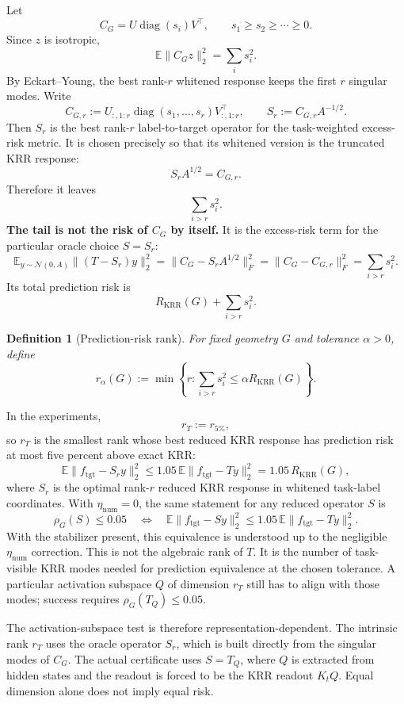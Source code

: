 \documentclass[11pt]{article}
\newtheorem{definition}{Definition}
\begin{document}
Let
\[
C_G=U\operatorname{diag}(s_i)V^\top,
\qquad
s_1\ge s_2\ge\cdots\ge0.
\]
Since \(z\) is isotropic,
\[
\mathbb{E}\|C_Gz\|_2^2=\sum_i s_i^2.
\]
By Eckart--Young, the best rank-\(r\) whitened response keeps the first \(r\) singular modes. Write
\[
C_{G,r}:=U_{:,1:r}\operatorname{diag}(s_1,\ldots,s_r)V_{:,1:r}^\top,
\qquad
S_r:=C_{G,r}A^{-1/2}.
\]
Then \(S_r\) is the best rank-\(r\) label-to-target operator for the task-weighted excess-risk
metric. It is chosen precisely so that its whitened version is the truncated KRR response:
\[
S_rA^{1/2}=C_{G,r}.
\]
Therefore it leaves
\[
\sum_{i>r}s_i^2.
\]
\textbf{The tail is not the risk of \(C_G\) by itself.} It is the excess-risk term for the
particular oracle choice \(S=S_r\):
\[
\mathbb{E}_{y\sim\mathcal{N}(0,A)}\|(T-S_r)y\|_2^2
=
\|C_G-S_rA^{1/2}\|_F^2
=
\|C_G-C_{G,r}\|_F^2
=
\sum_{i>r}s_i^2.
\]
Its total prediction risk is
\[
R_{\mathrm{KRR}}(G)+\sum_{i>r}s_i^2.
\]

\begin{definition}[Prediction-risk rank]
For fixed geometry \(G\) and tolerance \(\alpha>0\), define
\[
r_\alpha(G)
:=
\min\left\{
r:
\sum_{i>r}s_i^2
\le
\alpha R_{\mathrm{KRR}}(G)
\right\}.
\]
\end{definition}

In the experiments,
\[
r_T:=r_{5\%},
\]
so \(r_T\) is the smallest rank whose best reduced KRR response has prediction risk at most five
percent above exact KRR:
\[
\mathbb{E}\|f_{\mathrm{tgt}}-S_r y\|_2^2
\le
1.05\,\mathbb{E}\|f_{\mathrm{tgt}}-Ty\|_2^2
=
1.05\,R_{\mathrm{KRR}}(G),
\]
where \(S_r\) is the optimal rank-\(r\) reduced KRR response in whitened task-label coordinates.
With \(\eta_{\mathrm{num}}=0\), the same statement for any reduced operator \(S\) is
\[
\rho_G(S)\le0.05
\quad\Longleftrightarrow\quad
\mathbb{E}\|f_{\mathrm{tgt}}-Sy\|_2^2
\le
1.05\,\mathbb{E}\|f_{\mathrm{tgt}}-Ty\|_2^2.
\]
With the stabilizer present, this equivalence is understood up to the negligible
\(\eta_{\mathrm{num}}\) correction.
This is not the algebraic rank of \(T\). It is the number of task-visible KRR modes needed for
prediction equivalence at the chosen tolerance. A particular activation subspace \(Q\) of dimension
\(r_T\) still has to align with those modes; success requires \(\rho_G(T_Q)\le0.05\).

The activation-subspace test is therefore representation-dependent. The intrinsic rank \(r_T\)
uses the oracle operator \(S_r\), which is built directly from the singular modes of \(C_G\). The
actual certificate uses \(S=T_Q\), where \(Q\) is extracted from hidden states and the readout is
forced to be the KRR readout \(K_tQ\). Equal dimension alone does not imply equal risk.
\end{document}
